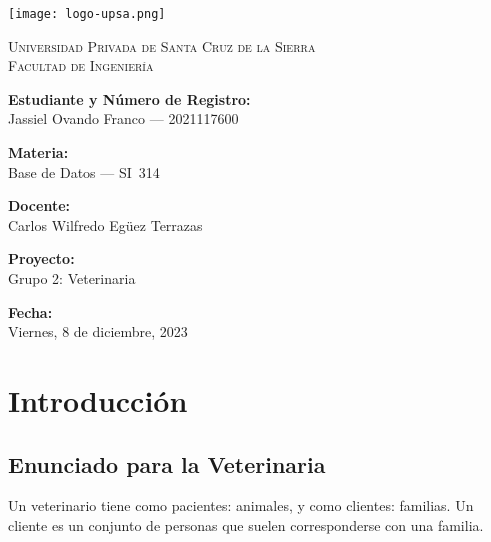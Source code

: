 \documentclass[
  12pt,
  hidelinks,
  a4paper,
  headings=standardclasses,
  headings=big,
  spanish
]{scrartcl}
\begin{document}
\begin{titlepage}
  \begin{center}
    \texttt{[image: logo-upsa.png]}
    \vspace*{\fill}

    \textsc{\Large{Universidad Privada de Santa Cruz de la Sierra}}\\
    \textsc{\Large{Facultad de Ingeniería}}
    \vspace*{\fill}

    \large{\textbf{Estudiante y Número de Registro:}}\\
    Jassiel Ovando Franco --- 2021117600
    \vspace*{\fill}

    \large{\textbf{Materia:}}\\
    Base de Datos --- SI~314
    \vspace*{\fill}

    \large{\textbf{Docente:}}\\
    Carlos Wilfredo Egüez Terrazas
    \vspace*{\fill}

    \large{\textbf{Proyecto:}}\\
    Grupo 2: Veterinaria
    \vspace*{\fill}

    \large{\textbf{Fecha:}}\\
    Viernes, 8 de diciembre, 2023
  \end{center}
\end{titlepage}

\newpage
{
  \hypersetup{linkcolor=black}
  \tableofcontents
  \pagebreak
  \listoffigures
}

\pagebreak
\section{Introducción}

\subsection{Enunciado para la Veterinaria}

Un veterinario tiene como pacientes: animales, y como clientes: familias.
Un cliente es un conjunto de personas que suelen corresponderse con una familia.
\end{document}
